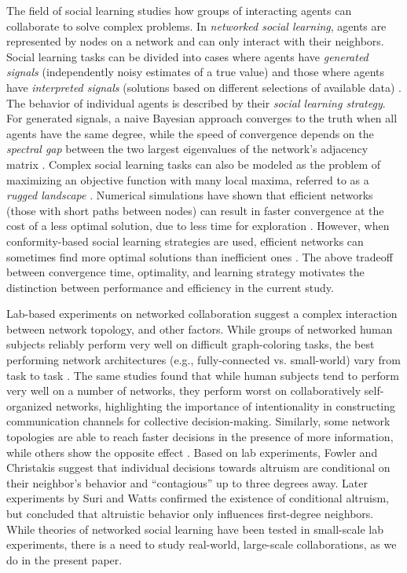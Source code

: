 The field of social learning studies how
groups of interacting agents
can collaborate to solve complex problems.
In {\em networked social learning},
agents are represented by nodes on a network
and can only interact with their neighbors.
Social learning tasks can be divided into cases where agents have {\em generated signals}
(independently noisy estimates of a true value)
and those where agents have {\em interpreted signals}
(solutions based on different selections of available data)
\cite{hong_interpreted_2009}.
The behavior of individual agents is described by their
{\em social learning strategy}.
For generated signals,
a naive Bayesian approach converges to the truth
when all agents have the same degree,
while the speed of convergence depends on the {\em spectral gap}
between the two largest eigenvalues of the network's adjacency matrix
\cite{degroot_reaching_1974,golub_naive_2010}.
Complex social learning tasks can also be modeled as the problem
of maximizing an objective function with many local maxima,
referred to as a {\em rugged landscape}
\cite{lazer_network_2007,mason_propagation_2008,mason_collaborative_2012,grim_scientific_2013,barkoczi_social_2016}.
Numerical simulations have shown that efficient networks
(those with short paths between nodes)
can result in faster convergence at the cost of a less optimal solution,
due to less time for exploration
\cite{mason_propagation_2008,grim_scientific_2013}.
However, when conformity-based social learning strategies are used,
efficient networks can sometimes find more optimal solutions than
inefficient ones \cite{barkoczi_social_2016}.
The above tradeoff between convergence time, optimality, and learning strategy
motivates the distinction between performance and efficiency in the current study.

Lab-based experiments on networked collaboration
suggest a complex interaction between network topology,
and other factors.
While groups of networked human subjects reliably perform very well on
difficult graph-coloring tasks, the best performing network architectures
(e.g., fully-connected vs. small-world) vary
from task to task \cite{kearns_experiments_2012}.
The same studies found that while human subjects tend to perform very well on
a number of networks, they perform worst on collaboratively self-organized
networks, highlighting the importance of intentionality
in constructing communication channels for collective decision-making.
Similarly, some network topologies are able to reach faster decisions in the
presence of more information, while others show the opposite effect
\cite{kearns_experimental_2006}.
Based on lab experiments, Fowler and Christakis \cite{fowler_cooperative_2010}
suggest that individual decisions towards altruism are conditional on their
neighbor's behavior and ``contagious'' up to three degrees away.
Later experiments by Suri and Watts \cite{suri_cooperation_2011} confirmed the
existence of conditional altruism,
but concluded that altruistic
behavior only influences first-degree neighbors.
While theories of networked social learning have been tested in small-scale lab experiments,
there is a need to study real-world, large-scale collaborations,
as we do in the present paper.

